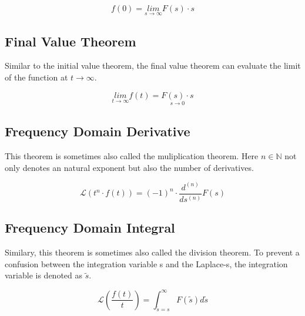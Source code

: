 \documentclass[./\jobname.tex]{subfiles}
\begin{document}
\begin{equation}
	f(0) = \underset{s \rightarrow \infty}{lim} F(s) \cdot s
\end{equation}

\subsection{Final Value Theorem}

Similar to the initial value theorem, the final value theorem can evaluate the limit of the function at $t \rightarrow \infty$. 

\begin{equation}
	\underset{t \rightarrow \infty}{lim} f(t) = \underset{s \rightarrow 0}{F(s) \cdot s}
\end{equation}

\subsection{Frequency Domain Derivative}
This theorem is sometimes also called the muliplication theorem. Here $n \in \mathbb{N}$ not only denotes an natural exponent but also the number of derivatives. 

\begin{equation}
	\mathcal{L} \left( t^n \cdot f(t) \right) = (-1)^n \cdot \frac{d^{(n)}}{ds^{(n)}} F(s)
\end{equation}


\subsection{Frequency Domain Integral}

Similary, this theorem is sometimes also called the division theorem. To prevent a confusion between the integration variable s and the Laplace-s, the integration variable is denoted as $\tilde{s}$.

\begin{equation}
\mathcal{L} \left(\frac{f(t)}{t}\right) = \int_{\tilde{s} = s}^{\infty} F(\tilde{s}) d\tilde{s}
\end{equation}
\end{document}
